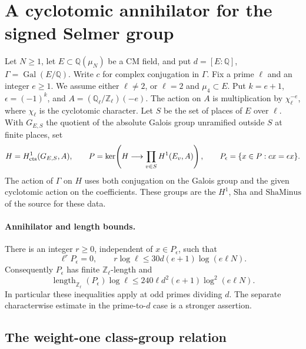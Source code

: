 \section{A cyclotomic annihilator for the signed Selmer group}
\label{sec:selmer-annihilator}

Let \(N\ge1\), let \(E\subset\mathbb Q(\mu_N)\) be a CM field, and put
\(d=[E:\mathbb Q]\), \(\Gamma=\operatorname{Gal}(E/\mathbb Q)\).
Write \(c\) for complex conjugation in \(\Gamma\). Fix a prime
\(\ell\) and an integer \(e\ge1\). We assume either
\(\ell\ne2\), or \(\ell=2\) and \(\mu_4\subset E\).
Put \(k=e+1\), \(\epsilon=(-1)^k\), and
\(A=(\mathbb Q_\ell/\mathbb Z_\ell)(-e)\). The action on \(A\)
is multiplication by \(\chi_\ell^{-e}\), where \(\chi_\ell\) is
the cyclotomic character. Let \(S\) be the set of places of \(E\)
over \(\ell\). With \(G_{E,S}\) the quotient of the absolute
Galois group unramified outside \(S\) at finite places, set
\[
 H=H^1_{\rm cts}(G_{E,S},A),\qquad
 P=\ker\!\left(H\longrightarrow\prod_{v\in S}H^1(E_v,A)\right),
 \qquad P_\epsilon=\{x\in P:cx=\epsilon x\}.
\]
The action of \(\Gamma\) on \(H\) uses both conjugation on the
Galois group and the given cyclotomic action on the coefficients.
These groups are the \(H^1\), \(\mathrm{Sha}\) and
\(\mathrm{ShaMinus}\) of the source for these data.

\paragraph{Annihilator and length bounds.}
There is an integer \(r\ge0\), independent of \(x\in P_\epsilon\),
such that
\begin{equation}
 \ell^r P_\epsilon=0,\qquad
 r\log\ell\le 30d(e+1)\log(e\ell N).
 \label{eq:cyclotomic-kill}
\end{equation}
Consequently \(P_\epsilon\) has finite \(\mathbb Z_\ell\)-length and
\begin{equation}
 \operatorname{length}_{\mathbb Z_\ell}(P_\epsilon)\log\ell
 \le 240\ell d^2(e+1)\log^2(e\ell N).
 \label{eq:cyclotomic-length}
\end{equation}
In particular these inequalities apply at odd primes dividing \(d\).
The separate characterwise estimate in the prime-to-\(d\) case is a
stronger assertion.

\subsection{The weight-one class-group relation}

